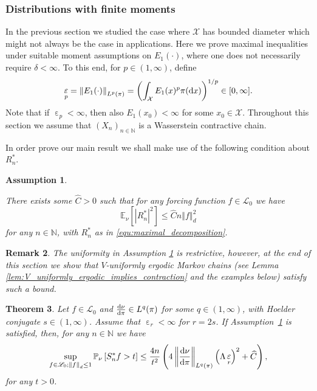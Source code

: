 \documentclass[12pt]{article}
\theoremstyle{plain}
\newtheorem{thm}{Theorem}[section]
\newtheorem{rem}[thm]{Remark}
\newtheorem{ass}[thm]{Assumption}
\renewcommand{\d}{{\rm d}}
\newcommand{\norm}[1]{\left\Vert #1 \right\Vert}
\newcommand{\N}{\mathbb{N}}
\newcommand{\E}{\mathbb{E}}
\newcommand{\cX}{\mathcal{X}}
\DeclareMathOperator{\eps}{\varepsilon}
\begin{document}
{\subsubsection{Distributions with finite moments}
In the previous section we studied the case where $\cX$ has bounded diameter which might not always be the case in applications. Here we prove maximal inequalities under suitable moment assumptions on $E_1(\cdot)$, where one does not necessarily require $\delta < \infty$.
To this end, for $p \in (1, \infty)$, define 
\[
\eps_p  = \norm{E_1(\cdot )}_{L^p(\pi)} = \left( \int_\cX E_1(x)^p \pi(\d x) \right)^{1/p} \in [0, \infty].  
\]
Note that if $\eps_p < \infty $, then also $E_1(x_0) < \infty$ for some $x_0 \in \cX$.
Throughout this section we assume that $(X_n)_{n \in \N}$ is a Wasserstein contractive chain. 

In order prove our main result we shall make use of the following condition about $R_n^*$. 
\begin{ass}\label{ass:bounded_R_n_star}
	
There exists some $\widehat{C} >0$ such that for any forcing function $f \in \mathscr{L}_0$ we have
\[
\E_\nu \left[ \left\vert R_n^*  \right\vert^2  \right] \leq \widehat{C} n \norm{f}_d^2
\] 
for any $n \in \N$, with $R_n^*$ as in \eqref{equ:maximal_decomposition}.  
\end{ass}

\begin{rem}
The uniformity in Assumption \ref{ass:bounded_R_n_star} is restrictive, however, at the end of this section we show that $V$-uniformly ergodic Markov chains (see Lemma \ref{lem:V_uniformly_ergodic_implies_contraction} and the examples below) satisfy such a bound. 
\end{rem}

\begin{thm}\label{thm:Doob_maximal_inequality_finite_moment_assumption}
Let $f \in \mathscr{L}_0$ and $\frac{\d \nu}{\d \pi} \in L^q(\pi)$ for some $q \in (1, \infty)$, with Hoelder conjugate $s \in (1, \infty)$. 
Assume that {$\eps_r<\infty$ for $r=2s$}.
If Assumption~\ref{ass:bounded_R_n_star} is satisfied, then, for any $n \in \N$  we have 
\[
\sup_{f \in \mathscr{L}_0; \norm{f}_d \leq 1}
\mathbb{P}_\nu\left[  S_n^*f > t \right] \leq \frac{4n}{t^2}\left(4 \norm{\frac{\d \nu}{\d \pi}}_{L^q(\pi)} \left(\Lambda \eps_r\right)^2 + \widehat{C} \right),
\]
for any $t>0$.
\end{thm}

}
\end{document}
